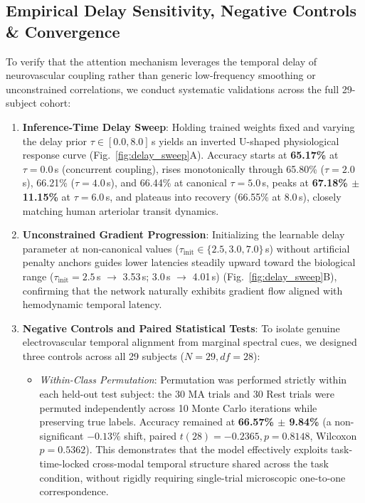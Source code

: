 \documentclass[journal]{IEEEtran}
\begin{document}
\subsection{Empirical Delay Sensitivity, Negative Controls \& Convergence}
To verify that the attention mechanism leverages the temporal delay of neurovascular coupling rather than generic low-frequency smoothing or unconstrained correlations, we conduct systematic validations across the full 29-subject cohort:
\begin{enumerate}
    \item \textbf{Inference-Time Delay Sweep}: Holding trained weights fixed and varying the delay prior $\tau \in [0.0, 8.0]$\,s yields an inverted U-shaped physiological response curve (Fig.~\ref{fig:delay_sweep}A). Accuracy starts at \textbf{65.17\%} at $\tau = 0.0$\,s (concurrent coupling), rises monotonically through 65.80\% ($\tau=2.0$\,s), 66.21\% ($\tau=4.0$\,s), and 66.44\% at canonical $\tau = 5.0$\,s, peaks at \textbf{67.18\% $\pm$ 11.15\%} at $\tau=6.0$\,s, and plateaus into recovery (66.55\% at 8.0\,s), closely matching human arteriolar transit dynamics.
    \item \textbf{Unconstrained Gradient Progression}: Initializing the learnable delay parameter at non-canonical values ($\tau_{\text{init}} \in \{2.5, 3.0, 7.0\}$\,s) without artificial penalty anchors guides lower latencies steadily upward toward the biological range ($\tau_{\text{init}} = 2.5$\,s $\to$ 3.53\,s; 3.0\,s $\to$ 4.01\,s) (Fig.~\ref{fig:delay_sweep}B), confirming that the network naturally exhibits gradient flow aligned with hemodynamic temporal latency.
    \item \textbf{Negative Controls and Paired Statistical Tests}: To isolate genuine electrovascular temporal alignment from marginal spectral cues, we designed three controls across all 29 subjects ($N=29, df=28$):
    \begin{itemize}
        \item \textit{Within-Class Permutation}: Permutation was performed strictly within each held-out test subject: the 30 MA trials and 30 Rest trials were permuted independently across 10 Monte Carlo iterations while preserving true labels. Accuracy remained at \textbf{66.57\% $\pm$ 9.84\%} (a non-significant $-0.13\%$ shift, paired $t(28) = -0.2365, p = 0.8148$, Wilcoxon $p = 0.5362$). This demonstrates that the model effectively exploits task-time-locked cross-modal temporal structure shared across the task condition, without rigidly requiring single-trial microscopic one-to-one correspondence.

\end{itemize}
\end{enumerate}
\end{document}
